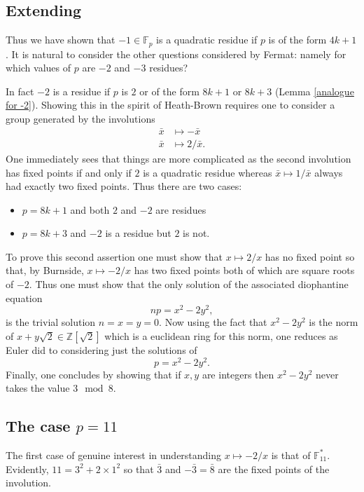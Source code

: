 \documentclass[12pt,a4paper]{amsart}
\def\fp{\mathbb{F}_p}
\begin{document}
\subsection{Extending}\label{extending}

Thus we have shown that $-1 \in \fp$ is a quadratic residue 
if $p$ is of the form $4k+1$. 
It is natural to consider the other questions considered by Fermat:
namely for which values of $p$ are $-2$ and $-3$ residues?


In fact  $-2$  is a residue if $p$ is $2$ or of the form $8k+1$ or
$8k+3$ (Lemma \ref{analogue for -2}).
Showing this in the spirit of Heath-Brown requires one to consider a group generated by the involutions 
\begin{eqnarray*}
	\bar{x} & \mapsto -\bar{x} \\
	\bar{x} & \mapsto 2/\bar{x}.
\end{eqnarray*}
One immediately sees that things are more complicated as the
second involution has fixed points if and only if $2$ is a quadratic residue
whereas $\bar{x}\mapsto 1/\bar{x}$ always had exactly two fixed points.
Thus there are two cases:
\begin{itemize}
	\item $p=8k+1$ and both $2$ and $-2$ are residues
	\item $p=8k+3$ and $-2$ is a residue but $2$ is not.
\end{itemize}
To prove this second assertion 
one must show that 
$x  \mapsto 2/x$ has no fixed point
so that, by Burnside,
$x  \mapsto -2/x$ has two fixed points 
both of which are square roots of $-2$.
Thus one must show that the only solution of the associated diophantine equation 
$$np = x^2 - 2y^2,$$
is the trivial solution $n=x=y=0$.
Now using the fact that 
$x^2 - 2y^2$ 
is the norm of $x+y \sqrt{2}\in \mathbb{Z}[\sqrt{2}]$ which is a
euclidean ring for this norm,
one reduces as Euler did  to considering just the solutions of 
$$p = x^2 - 2y^2.$$
Finally, 
one concludes by showing that if $x,y$ are integers then
$x^2 - 2y^2$ never takes the value $3 \mod 8$.

\subsection{The case $p=11$}

The first case of genuine interest in understanding 
$x\mapsto -2/x$ is that of $\mathbb{F}_{11}^*$.
Evidently, $11 = 3^2 + 2\times 1^2$ so that 
$\bar{3}$ and $-\bar{3} = \bar{8}$ are the fixed points of the involution.
\end{document}
